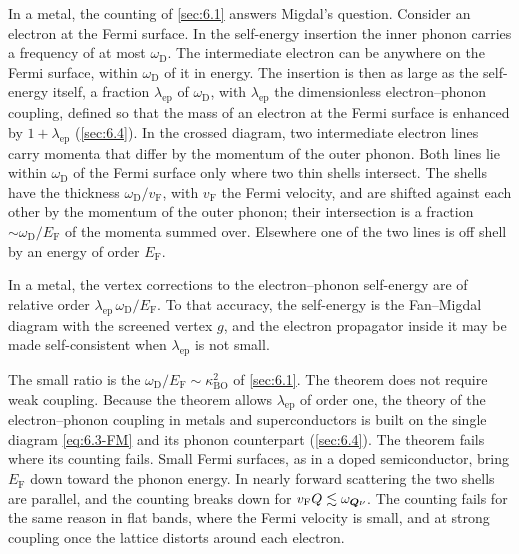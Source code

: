 In a metal, the counting of \cref{sec:6.1} answers Migdal's question. Consider an electron at the Fermi surface. In the self-energy insertion the inner phonon carries a frequency of at most $\omega_{\mathrm{D}}$. The intermediate electron can be anywhere on the Fermi surface, within $\omega_{\mathrm{D}}$ of it in energy. The insertion is then as large as the self-energy itself, a fraction $\lambda_{\mathrm{ep}}$ of $\omega_{\mathrm{D}}$, with $\lambda_{\mathrm{ep}}$ the dimensionless electron--phonon coupling, defined so that the mass of an electron at the Fermi surface is enhanced by $1 + \lambda_{\mathrm{ep}}$ (\cref{sec:6.4}). In the crossed diagram, two intermediate electron lines carry momenta that differ by the momentum of the outer phonon. Both lines lie within $\omega_{\mathrm{D}}$ of the Fermi surface only where two thin shells intersect. The shells have the thickness $\omega_{\mathrm{D}}/v_{\mathrm{F}}$, with $v_{\mathrm{F}}$ the Fermi velocity, and are shifted against each other by the momentum of the outer phonon; their intersection is a fraction $\sim\omega_{\mathrm{D}}/E_{\mathrm{F}}$ of the momenta summed over. Elsewhere one of the two lines is off shell by an energy of order $E_{\mathrm{F}}$.
\begin{keyresult}
In a metal, the vertex corrections to the electron--phonon self-energy are of relative order $\lambda_{\mathrm{ep}}\,\omega_{\mathrm{D}}/E_{\mathrm{F}}$. To that accuracy, the self-energy is the Fan--Migdal diagram with the screened vertex $g$, and the electron propagator inside it may be made self-consistent when $\lambda_{\mathrm{ep}}$ is not small.
\end{keyresult}
The small ratio is the $\omega_{\mathrm{D}}/E_{\mathrm{F}} \sim \kappa_{\mathrm{BO}}^2$ of \cref{sec:6.1}. The theorem does not require weak coupling. Because the theorem allows $\lambda_{\mathrm{ep}}$ of order one, the theory of the electron--phonon coupling in metals and superconductors is built on the single diagram \cref{eq:6.3-FM} and its phonon counterpart (\cref{sec:6.4}). The theorem fails where its counting fails. Small Fermi surfaces, as in a doped semiconductor, bring $E_{\mathrm{F}}$ down toward the phonon energy. In nearly forward scattering the two shells are parallel, and the counting breaks down for $v_{\mathrm{F}}Q \lesssim \omega_{\bm{Q}\nu}$. The counting fails for the same reason in flat bands, where the Fermi velocity is small, and at strong coupling once the lattice distorts around each electron.

